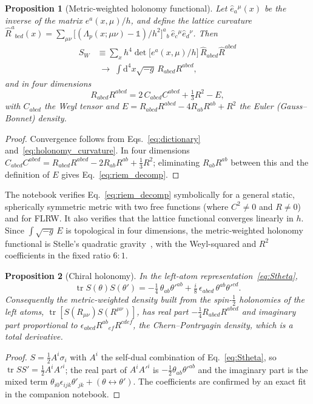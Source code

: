 \documentclass[reprint,aps,prd,amsmath,amssymb,superscriptaddress,nofootinbib,floatfix]{revtex4-2}
\theoremstyle{plain}
\newtheorem{proposition}{Proposition}
\theoremstyle{definition}
\theoremstyle{remark}
\newcommand{\tr}{\operatorname{tr}}
\newcommand{\dd}{\mathrm{d}}
\newcommand{\one}{\mathbb{1}}
\begin{document}
\begin{proposition}[Metric-weighted holonomy functional]
\label{prop:riem2}
Let $\hat e_a{}^\mu(x)$ be the inverse of the matrix $e^a(x,\mu)/h$, and define the lattice curvature
$\hat R^a{}_{bcd}(x)=\sum_{\mu\nu}\big[(\Lambda_p(x;\mu\nu)-\one)/h^2\big]^a{}_b\,\hat e_c{}^\mu\hat e_d{}^\nu$. Then
\begin{equation}
\begin{aligned}
S_W&\equiv\sum_xh^4\det\!\big[e^a(x,\mu)/h\big]\,\hat R_{abcd}\hat R^{abcd}\\
&\;\longrightarrow\;\int\dd^4x\sqrt{-g}\,R_{abcd}R^{abcd},
\end{aligned}
\label{eq:SW}
\end{equation}
and in four dimensions
\begin{equation}
R_{abcd}R^{abcd}=2\,C_{abcd}C^{abcd}+\tfrac13R^2-E,
\label{eq:riem_decomp}
\end{equation}
with $C_{abcd}$ the Weyl tensor and $E=R_{abcd}R^{abcd}-4R_{ab}R^{ab}+R^2$ the Euler (Gauss--Bonnet) density.
\end{proposition}
\begin{proof}
Convergence follows from Eqs.~\eqref{eq:dictionary} and~\eqref{eq:holonomy_curvature}. In four dimensions
$C_{abcd}C^{abcd}=R_{abcd}R^{abcd}-2R_{ab}R^{ab}+\tfrac13R^2$; eliminating $R_{ab}R^{ab}$ between this and
the definition of $E$ gives Eq.~\eqref{eq:riem_decomp}.
\end{proof}

The notebook verifies Eq.~\eqref{eq:riem_decomp} symbolically for a general static, spherically symmetric
metric with two free functions (where $C^2\neq0$ and $R\neq0$) and for FLRW. It also verifies that the
lattice functional converges linearly in $h$. Since $\int\sqrt{-g}\,E$ is topological in
four dimensions, the metric-weighted holonomy functional is Stelle's quadratic
gravity~\cite{Stelle1977,Stelle1978}, with the Weyl-squared and $R^2$ coefficients in the fixed ratio $6:1$.

\begin{proposition}[Chiral holonomy]
\label{prop:chiral}
In the left-atom representation~\eqref{eq:Stheta},
\begin{equation}
\tr S(\theta)S(\theta')=-\tfrac14\,\theta_{ab}\theta'^{ab}+\tfrac{i}{8}\,\epsilon_{abcd}\,\theta^{ab}\theta'^{cd}.
\label{eq:chiral_trace}
\end{equation}
Consequently the metric-weighted density built from the spin-$\tfrac12$ holonomies of the left atoms,
$\tr[S(R_{\mu\nu})S(R^{\mu\nu})]$, has real part $-\tfrac14R_{abcd}R^{abcd}$ and imaginary part proportional to
$\epsilon_{abcd}R^{ab}{}_{ef}R^{cdef}$, the Chern--Pontryagin density, which is a total derivative.
\end{proposition}
\begin{proof}
$S=\tfrac12A^i\sigma_i$ with $A^i$ the self-dual combination of Eq.~\eqref{eq:Stheta}, so
$\tr SS'=\tfrac12A^iA'^i$; the real part of $A^iA'^i$ is $-\tfrac12\theta_{ab}\theta'^{ab}$ and the imaginary part is the
mixed term $\theta_{i0}\epsilon_{ijk}\theta'_{jk}+(\theta\leftrightarrow\theta')$. The coefficients are confirmed by an exact fit in
the companion notebook.
\end{proof}
\end{document}
